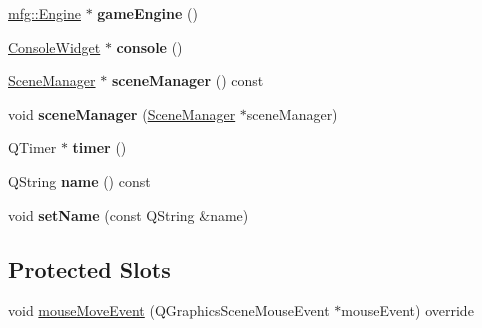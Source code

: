 \begin{DoxyCompactItemize}
\item 
\mbox{\label{class_game_scene_a0d67003cada8079ada8c2bf7ea924134}} 
\hyperlink{classmfg_1_1_engine}{mfg\+::\+Engine} $\ast$ {\bfseries game\+Engine} ()
\item 
\mbox{\label{class_game_scene_a774aaa53865ee6184b3bbcec5ed976b0}} 
\hyperlink{class_console_widget}{Console\+Widget} $\ast$ {\bfseries console} ()
\item 
\mbox{\label{class_game_scene_ac0fedd57d4e9d653803b27fd62485211}} 
\hyperlink{class_scene_manager}{Scene\+Manager} $\ast$ {\bfseries scene\+Manager} () const
\item 
\mbox{\label{class_game_scene_a415fd6b00796cce9ac40618e3f94db4b}} 
void {\bfseries scene\+Manager} (\hyperlink{class_scene_manager}{Scene\+Manager} $\ast$scene\+Manager)
\item 
\mbox{\label{class_game_scene_a2f075555a06267a4e150506c423846b0}} 
Q\+Timer $\ast$ {\bfseries timer} ()
\item 
\mbox{\label{class_game_scene_a0fd4969df4e5f5f635f9ab5d3e66c404}} 
Q\+String {\bfseries name} () const
\item 
\mbox{\label{class_game_scene_a6eb8d5be7ee8f1ebb50a7fd49e9c2a35}} 
void {\bfseries set\+Name} (const Q\+String \&name)
\end{DoxyCompactItemize}
\subsection*{Protected Slots}
\begin{DoxyCompactItemize}
\item 
void \hyperlink{class_game_scene_a60e084f3ade89e765a5ff86f2c0d7bf1}{mouse\+Move\+Event} (Q\+Graphics\+Scene\+Mouse\+Event $\ast$mouse\+Event) override
\end{DoxyCompactItemize}
